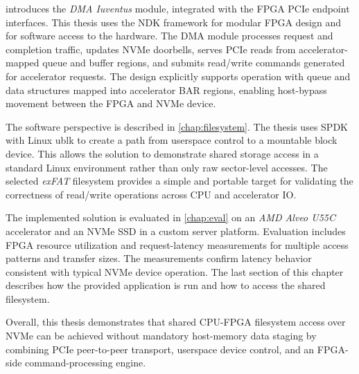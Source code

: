  introduces the \emph{DMA Iuventus} module, integrated with the FPGA PCIe
endpoint interfaces. This thesis uses the NDK framework for modular FPGA design and for software
access to the hardware. The DMA module processes request and completion traffic, updates NVMe
doorbells, serves PCIe reads from accelerator-mapped queue and buffer regions, and submits
read/write commands generated for accelerator requests. The design explicitly supports operation
with queue and data structures mapped into accelerator BAR regions, enabling host-bypass movement
between the FPGA and NVMe device.

The software perspective is described in \cref{chap:filesystem}. The thesis uses SPDK with Linux
ublk to create a path from userspace control to a mountable block device. This allows the solution
to demonstrate shared storage access in a standard Linux environment rather than only raw
sector-level accesses. The selected \emph{exFAT} filesystem provides a simple and portable target for
validating the correctness of read/write operations across CPU and accelerator IO.

The implemented solution is evaluated in \cref{chap:eval} on an \emph{AMD Alveo U55C} accelerator
and an NVMe SSD in a custom server platform. Evaluation includes FPGA resource utilization and
request-latency measurements for multiple access patterns and transfer sizes. The measurements
confirm latency behavior consistent with typical NVMe device operation. The last section of this
chapter describes how the provided application is run and how to access the shared filesystem.

Overall, this thesis demonstrates that shared CPU-FPGA filesystem access over NVMe can be achieved
without mandatory host-memory data staging by combining PCIe peer-to-peer transport, userspace
device control, and an FPGA-side command-processing engine.